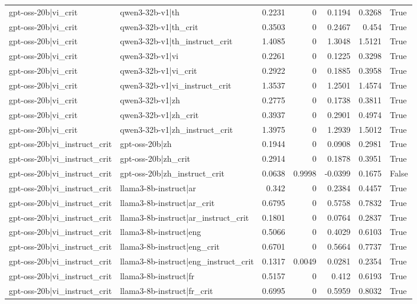 \begin{table}
\begin{tabular}{l l r r r r l}
gpt-oss-20b|vi_crit & qwen3-32b-v1|th & 0.2231 & 0 & 0.1194 & 0.3268 & True \\
gpt-oss-20b|vi_crit & qwen3-32b-v1|th_crit & 0.3503 & 0 & 0.2467 & 0.454 & True \\
gpt-oss-20b|vi_crit & qwen3-32b-v1|th_instruct_crit & 1.4085 & 0 & 1.3048 & 1.5121 & True \\
gpt-oss-20b|vi_crit & qwen3-32b-v1|vi & 0.2261 & 0 & 0.1225 & 0.3298 & True \\
gpt-oss-20b|vi_crit & qwen3-32b-v1|vi_crit & 0.2922 & 0 & 0.1885 & 0.3958 & True \\
gpt-oss-20b|vi_crit & qwen3-32b-v1|vi_instruct_crit & 1.3537 & 0 & 1.2501 & 1.4574 & True \\
gpt-oss-20b|vi_crit & qwen3-32b-v1|zh & 0.2775 & 0 & 0.1738 & 0.3811 & True \\
gpt-oss-20b|vi_crit & qwen3-32b-v1|zh_crit & 0.3937 & 0 & 0.2901 & 0.4974 & True \\
gpt-oss-20b|vi_crit & qwen3-32b-v1|zh_instruct_crit & 1.3975 & 0 & 1.2939 & 1.5012 & True \\
gpt-oss-20b|vi_instruct_crit & gpt-oss-20b|zh & 0.1944 & 0 & 0.0908 & 0.2981 & True \\
gpt-oss-20b|vi_instruct_crit & gpt-oss-20b|zh_crit & 0.2914 & 0 & 0.1878 & 0.3951 & True \\
gpt-oss-20b|vi_instruct_crit & gpt-oss-20b|zh_instruct_crit & 0.0638 & 0.9998 & -0.0399 & 0.1675 & False \\
gpt-oss-20b|vi_instruct_crit & llama3-8b-instruct|ar & 0.342 & 0 & 0.2384 & 0.4457 & True \\
gpt-oss-20b|vi_instruct_crit & llama3-8b-instruct|ar_crit & 0.6795 & 0 & 0.5758 & 0.7832 & True \\
gpt-oss-20b|vi_instruct_crit & llama3-8b-instruct|ar_instruct_crit & 0.1801 & 0 & 0.0764 & 0.2837 & True \\
gpt-oss-20b|vi_instruct_crit & llama3-8b-instruct|eng & 0.5066 & 0 & 0.4029 & 0.6103 & True \\
gpt-oss-20b|vi_instruct_crit & llama3-8b-instruct|eng_crit & 0.6701 & 0 & 0.5664 & 0.7737 & True \\
gpt-oss-20b|vi_instruct_crit & llama3-8b-instruct|eng_instruct_crit & 0.1317 & 0.0049 & 0.0281 & 0.2354 & True \\
gpt-oss-20b|vi_instruct_crit & llama3-8b-instruct|fr & 0.5157 & 0 & 0.412 & 0.6193 & True \\
gpt-oss-20b|vi_instruct_crit & llama3-8b-instruct|fr_crit & 0.6995 & 0 & 0.5959 & 0.8032 & True \\

\end{tabular}
\end{table}
